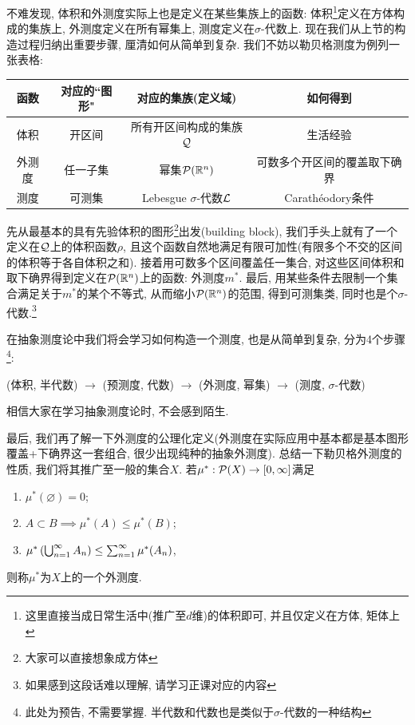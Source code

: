 不难发现, 体积和外测度实际上也是定义在某些集族上的函数:
体积\footnote{这里直接当成日常生活中(推广至$d$维)的体积即可, 并且仅定义在方体, 矩体上}定义在方体构成的集族上, 外测度定义在所有幂集上, 测度定义在$\sigma$-代数上.
现在我们从上节的构造过程归纳出重要步骤, 厘清如何从简单到复杂. 
我们不妨以勒贝格测度为例列一张表格:
\begin{center}
    \begin{tabular}{ |c|c|c|c| } 
    \hline
    函数 & 对应的``图形" & 对应的集族(定义域) & 如何得到 \\ 
    \hline
    体积 & 开区间 & 所有开区间构成的集族$\mathcal{Q}$  & 生活经验 \\ 
    \hline
    外测度 & 任一子集 & 幂集$\mathcal{P}(\mathbb{R}^n)$ & 可数多个开区间的覆盖取下确界 \\ 
    \hline
    测度 & 可测集 & Lebesgue $\sigma$-代数$\mathcal{L}$ & Carath\'eodory条件 \\
    \hline
    \end{tabular}
\end{center}
先从最基本的具有先验体积的图形\footnote{大家可以直接想象成方体}出发(building block), 我们手头上就有了一个定义在$\mathcal{Q}$上的体积函数$\rho$, 且这个函数自然地满足有限可加性(有限多个不交的区间的体积等于各自体积之和). 接着用可数多个区间覆盖任一集合, 对这些区间体积和取下确界得到定义在$\mathcal{P}(\mathbb{R}^n)$上的函数: 外测度$m^*$. 最后, 用某些条件去限制一个集合满足关于$m^*$的某个不等式, 从而缩小$\mathcal{P}(\mathbb{R}^n)$的范围, 得到可测集类, 同时也是个$\sigma$-代数.\footnote{如果感到这段话难以理解, 请学习正课对应的内容}

在抽象测度论中我们将会学习如何构造一个测度, 也是从简单到复杂, 分为4个步骤\footnote{此处为预告, 不需要掌握. 半代数和代数也是类似于$\sigma$-代数的一种结构}:
\begin{center}
    (体积, 半代数) $\rightarrow$ (预测度, 代数) $\rightarrow$ (外测度, 幂集) $\rightarrow$ (测度, $\sigma$-代数)
\end{center}
相信大家在学习抽象测度论时, 不会感到陌生. 

最后, 我们再了解一下外测度的公理化定义(外测度在实际应用中基本都是基本图形覆盖+下确界这一套组合, 很少出现纯种的抽象外测度). 总结一下勒贝格外测度的性质, 我们将其推广至一般的集合$X$. 
若$\mu^*: \mathcal{P}(X) \to [0, \infty]$满足
\begin{enumerate}
    \item $\mu^*(\varnothing) = 0$;
    \item $A \subset B \implies \mu^*(A) \leq \mu^*(B)$;
    \item $\mu^*\left(\bigcup_{n=1}^{\infty}A_n\right) \leq \sum_{n=1}^{\infty} \mu^*(A_n)$,
\end{enumerate}
则称$\mu^*$为$X$上的一个外测度. 

